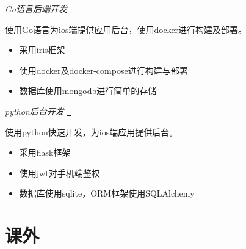 \documentclass{uniquecv}
\begin{document}
\textit{Go语言后端开发}
\quad \href{https://github.com/colinaaa/hackweek}{{\color{gray}{\faLink}}~}
\vspace{0.4ex}

使用Go语言为ios端提供应用后台，使用docker进行构建及部署。

\begin{itemize}
  \item 采用iris框架
  \item 使用docker及docker-compose进行构建与部署
  \item 数据库使用mongodb进行简单的存储
\end{itemize}

\textit{python后台开发}
\quad \href{https://github.com/colinaaa/tasks_uniquestudio}{{\color{gray}{\faLink}}~}

使用python快速开发，为ios端应用提供后台。
\vspace{0.4ex}
\begin{itemize}
		\item 采用flask框架
		\item 使用jwt对手机端鉴权
		\item 数据库使用sqlite，ORM框架使用SQLAlchemy
\end{itemize}

\section{课外}
\end{document}

